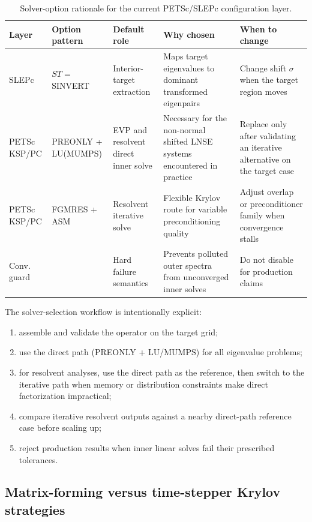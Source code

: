 \documentclass[11pt]{article}
\begin{document}
\begin{table}[t]
\centering
\footnotesize
\setlength{\tabcolsep}{4pt}
\begin{tabular}{L{1.7cm}L{2.7cm}L{2.8cm}L{3.0cm}L{3.2cm}}
\toprule
Layer & Option pattern & Default role & Why chosen & When to change \\
\midrule
SLEPc & $ST=$ SINVERT & Interior-target extraction & Maps target eigenvalues to dominant transformed eigenpairs & Change shift $\sigma$ when the target region moves \\
PETSc KSP/PC & PREONLY + LU(MUMPS) & EVP and resolvent direct inner solve & Necessary for the non-normal shifted LNSE systems encountered in practice & Replace only after validating an iterative alternative on the target case \\
PETSc KSP/PC & FGMRES + ASM & Resolvent iterative solve & Flexible Krylov route for variable preconditioning quality & Adjust overlap or preconditioner family when convergence stalls \\
Conv. guard &  & Hard failure semantics & Prevents polluted outer spectra from unconverged inner solves & Do not disable for production claims \\
\bottomrule
\end{tabular}
\caption{Solver-option rationale for the current PETSc/SLEPc configuration
layer.}
\label{tab:solver_rationale}
\end{table}

The solver-selection workflow is intentionally explicit:
\begin{enumerate}[label=\arabic*., nosep]
  \item assemble and validate the operator on the target grid;
  \item use the direct path (PREONLY + LU/MUMPS) for all eigenvalue problems;
  \item for resolvent analyses, use the direct path as the reference, then
    switch to the iterative path when memory or distribution constraints make
    direct factorization impractical;
  \item compare iterative resolvent outputs against a nearby direct-path
    reference case before scaling up;
  \item reject production results when inner linear solves fail their
    prescribed tolerances.
\end{enumerate}

\subsection{Matrix-forming versus time-stepper Krylov strategies}
\label{sec:krylov_roles}
\end{document}
